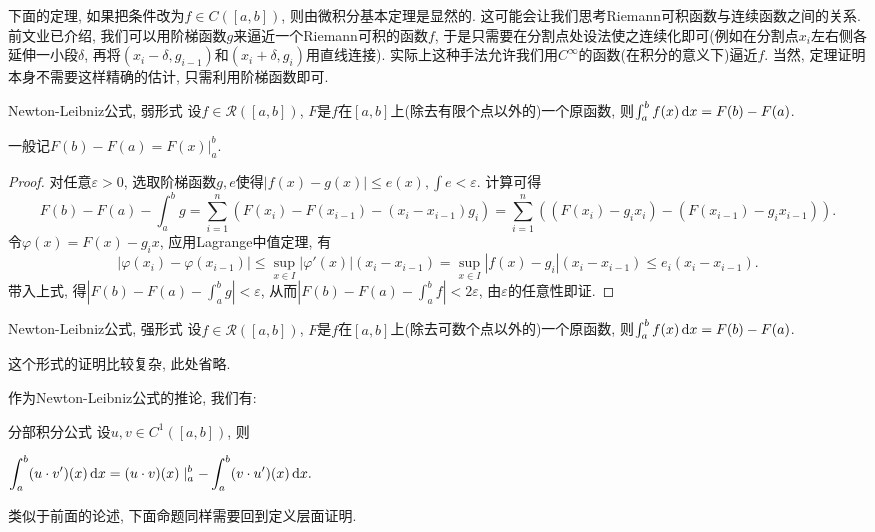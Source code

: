 下面的定理, 如果把条件改为$f \in C([a,b])$, 则由微积分基本定理是显然的. 这可能会让我们思考Riemann可积函数与连续函数之间的关系. 前文业已介绍, 我们可以用阶梯函数$g$来逼近一个Riemann可积的函数$f$, 于是只需要在分割点处设法使之连续化即可(例如在分割点$x_i$左右侧各延伸一小段$\delta$, 再将$(x_i-\delta ,g_{i-1})$和$(x_i+\delta ,g_{i})$用直线连接). 实际上这种手法允许我们用$C^{\infty}$的函数(在积分的意义下)逼近$f$. 当然, 定理证明本身不需要这样精确的估计, 只需利用阶梯函数即可. 

\begin{theorem}{Newton-Leibniz公式, 弱形式} \label{thm:NLro}
	设$f \in \mathcal{R}([a,b])$, $F$是$f$在$[a,b]$上(除去有限个点以外的)一个原函数, 则$\int_a^b f(x) \mathop{}\!\mathrm{d} x = F(b)-F(a)$. 
\end{theorem}
\begin{remark}
	一般记$F(b)-F(a)=F(x)|_a^b$. 
\end{remark}
\begin{proof}
	对任意$\varepsilon >0$, 选取阶梯函数$g,e$使得$|f(x)-g(x)| \leq e(x),\int e <\varepsilon$. 计算可得$$F(b)-F(a)-\int_a^b g = \sum_{i=1}^{n} (F(x_i)-F(x_{i-1})-(x_i-x_{i-1})g_i) = \sum_{i=1}^{n} ((F(x_i)-g_ix_i)-(F(x_{i-1})-g_ix_{i-1})). $$
	令$\varphi (x)=F(x)-g_ix$, 应用Lagrange中值定理, 有$$|\varphi (x_i)-\varphi (x_{i-1})| \leq \sup_{x \in I}|\varphi '(x)|(x_i-x_{i-1}) = \sup_{x \in I}|f(x)-g_i|(x_i-x_{i-1}) \leq e_i(x_i-x_{i-1}).$$
	带入上式, 得$|F(b)-F(a)-\int_a^b g| < \varepsilon$, 从而$|F(b)-F(a)-\int_a^b f| <2\varepsilon$, 由$\varepsilon$的任意性即证. 
\end{proof}

\begin{theorem}{Newton-Leibniz公式, 强形式}
	设$f \in \mathcal{R}([a,b])$, $F$是$f$在$[a,b]$上(除去可数个点以外的)一个原函数, 则$\int_a^b f(x) \mathop{}\!\mathrm{d} x = F(b)-F(a)$. 
\end{theorem}
\begin{remark}
	这个形式的证明比较复杂, 此处省略. 
\end{remark}

作为Newton-Leibniz公式的推论, 我们有: 

\begin{proposition}{分部积分公式}
	设$u,v\in C^1([a,b])$, 则
	\begin{center}
		$\displaystyle \int_a^b (u\cdot v')(x) \mathop{}\!\mathrm{d} x = (u\cdot v)(x)\mid _a^b - \int_a^b (v \cdot u')(x) \mathop{}\!\mathrm{d} x.$
	\end{center}
\end{proposition}

类似于前面的论述, 下面命题同样需要回到定义层面证明. 

